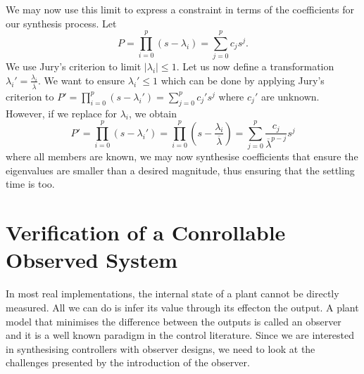 \documentclass[sigconf]{llncs}
\begin{document}
%
We may now use this limit to express a constraint in terms of the
coefficients for our synthesis process.  Let
%
\begin{equation}
P=\prod_{i=0}^p (s-\lambda_i)=\sum_{j=0}^p c_js^j.
\end{equation}
%
We use Jury's criterion to limit $|\lambda_i| \leq 1$.  Let us now define a
transformation $\lambda_i'=\frac{\lambda_i}{\overline{\lambda}}$.  We want
to ensure $\lambda_i' \leq 1$ which can be done by applying Jury's criterion
to $P'=\prod_{i=0}^p (s-\lambda_i')=\sum_{j=0}^p c_j's^j$ where $c_j'$ are
unknown.  However, if we replace for $\lambda_i$, we obtain
%
\begin{equation}
P'=\prod_{i=0}^p (s-\lambda_i')=\prod_{i=0}^p \left(s-\frac{\lambda_i}{\overline{\lambda}}\right)=\sum_{j=0}^p \frac{c_j}{\overline{\lambda}^{p-j}}s^j
\end{equation}
%
where all members are known, we may now synthesise coefficients that ensure
the eigenvalues are smaller than a desired magnitude, thus ensuring that the
settling time is too.

\section{Verification of a Conrollable Observed System}\label{sec:cof_verification}

In most real implementations, the internal state of a plant cannot be directly measured. All we can do is infer its
value through its effecton the output. A plant model that minimises the difference between the outputs is called
an observer and it is a well known paradigm in the control literature\cite{astrom1997computer}. Since we are
interested in synthesising controllers with observer designs, we need to look at the challenges presented by 
the introduction of the observer.
\end{document}
